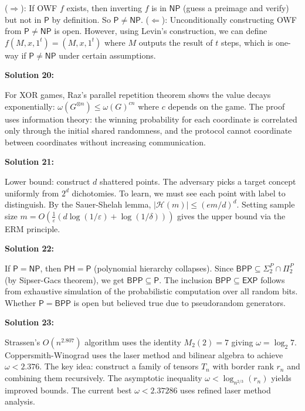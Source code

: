 \documentclass[12pt,a4paper]{exam}
\begin{document}
($\Rightarrow$): If OWF $f$ exists, then inverting $f$ is in $\mathsf{NP}$ (guess a preimage and verify) but not in $\mathsf{P}$ by definition. So $\mathsf{P} \neq \mathsf{NP}$. ($\Leftarrow$): Unconditionally constructing OWF from $\mathsf{P} \neq \mathsf{NP}$ is open. However, using Levin's construction, we can define $f(M,x,1^t) = (M,x,1^t)$ where $M$ outputs the result of $t$ steps, which is one-way if $\mathsf{P} \neq \mathsf{NP}$ under certain assumptions.

\vspace{0.5cm}

\textbf{Solution 20:}

For XOR games, Raz's parallel repetition theorem shows the value decays exponentially: $\omega(G^{\otimes n}) \leq \omega(G)^{c n}$ where $c$ depends on the game. The proof uses information theory: the winning probability for each coordinate is correlated only through the initial shared randomness, and the protocol cannot coordinate between coordinates without increasing communication.

\vspace{0.5cm}

\textbf{Solution 21:}

Lower bound: construct $d$ shattered points. The adversary picks a target concept uniformly from $2^d$ dichotomies. To learn, we must see each point with label to distinguish. By the Sauer-Shelah lemma, $|\mathcal{H}(m)| \leq (em/d)^d$. Setting sample size $m = O(\frac{1}{\varepsilon}(d \log(1/\varepsilon) + \log(1/\delta)))$ gives the upper bound via the ERM principle.

\vspace{0.5cm}

\textbf{Solution 22:}

If $\mathsf{P} = \mathsf{NP}$, then $\mathsf{PH} = \mathsf{P}$ (polynomial hierarchy collapses). Since $\mathsf{BPP} \subseteq \Sigma_2^P \cap \Pi_2^P$ (by Sipser-Gacs theorem), we get $\mathsf{BPP} \subseteq \mathsf{P}$. The inclusion $\mathsf{BPP} \subseteq \mathsf{EXP}$ follows from exhaustive simulation of the probabilistic computation over all random bits. Whether $\mathsf{P} = \mathsf{BPP}$ is open but believed true due to pseudorandom generators.

\vspace{0.5cm}

\textbf{Solution 23:}

Strassen's $O(n^{2.807})$ algorithm uses the identity $M_2(2) = 7$ giving $\omega = \log_2 7$. Coppersmith-Winograd uses the laser method and bilinear algebra to achieve $\omega < 2.376$. The key idea: construct a family of tensors $T_n$ with border rank $r_n$ and combining them recursively. The asymptotic inequality $\omega < \log_{n^{2/3}}(r_n)$ yields improved bounds. The current best $\omega < 2.37286$ uses refined laser method analysis.
\end{document}

